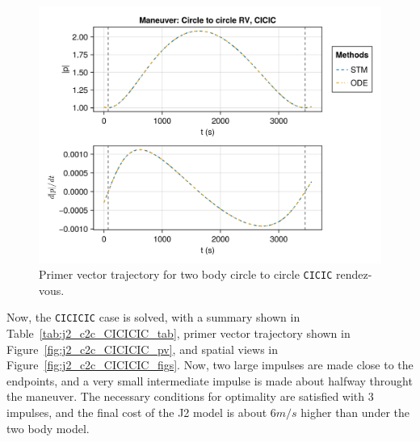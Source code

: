 \begin{figure}[htbp]
    \centering
    \includegraphics[width=\linewidth]{../results/j2/hohmann/CICIC_primer_vector.png}
    \caption{Primer vector trajectory for two body circle to circle \texttt{CICIC} rendez-vous.}
    \label{fig:j2_c2c_CICIC_pv}
\end{figure}

Now, the \texttt{CICICIC} case is solved, with a summary shown in Table~\ref{tab:j2_c2c_CICICIC_tab}, primer vector trajectory shown in Figure~\ref{fig:j2_c2c_CICICIC_pv}, and spatial views in Figure~\ref{fig:j2_c2c_CICICIC_figs}. Now, two large impulses are made close to the endpoints, and a very small intermediate impulse is made about halfway throught the maneuver. The necessary conditions for optimality are satisfied with 3 impulses, and the final cost of the J2 model is about \(6 m/s\) higher than under the two body model.

